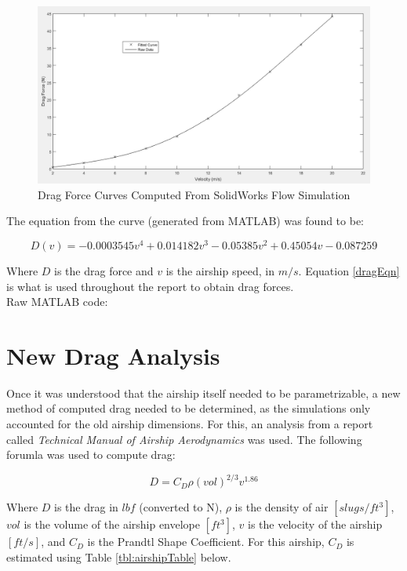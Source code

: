 \documentclass[../main.tex]{subfiles}
\begin{document}
\begin{figure}[H]
	\centering
	\includegraphics[width=\linewidth]{img/drag/curveFit.PNG}
	\caption{Drag Force Curves Computed From SolidWorks Flow Simulation}
	\label{fig:curveFit}
\end{figure}

The equation from the curve (generated from MATLAB) was found to be:

\begin{equation} \label{dragEqn}
	D(v) = -0.0003545v^4 + 0.014182v^3 -0.05385v^2 + 0.45054v -0.087259
\end{equation}

Where $ D $ is the drag force and $ v $ is the airship speed, in $m/s$. Equation \ref{dragEqn} is what is used throughout the report to obtain drag forces.\\

Raw MATLAB code:



\section{New Drag Analysis}

Once it was understood that the airship itself needed to be parametrizable, a new method of computed drag needed to be determined, as the simulations only accounted for the old airship dimensions. For this, an analysis from a report called \textit{Technical Manual of Airship Aerodynamics} \cite{airshipAerodynamics} was used. The following forumla was used to compute drag:

\begin{equation}
		D = C_D\rho (vol)^{2/3}v^{1.86}
\end{equation}

Where $D$ is the drag in $lbf$ (converted to N), $ \rho $ is the density of air $[slugs/ft^3]$, $vol$ is the volume of the airship envelope $[ft^3]$, $v$ is the velocity of the airship $[ft/s]$, and $C_D$ is the Prandtl Shape Coefficient. For this airship, $C_D$ is estimated using Table \ref{tbl:airshipTable} below.
\end{document}
